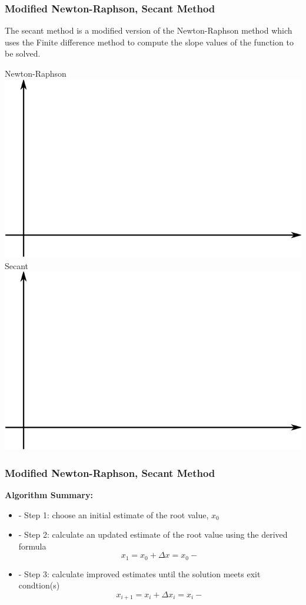 \documentclass[fleqn]{beamer} %
\newcommand{\sectionIIsubsectionVtitle}{Modified Newton-Raphson, Secant Method}
\begin{document}
			\begin{frame}
				\frametitle{\sectionIIsubsectionVtitle}
				\bigskip

				The {\PR secant} method is a modified version of the Newton-Raphson method which uses the Finite difference method to compute the slope values of the function to be solved. \\

				\begin{multicols}{2}
				Newton-Raphson
				\includegraphics[scale=.22]{images/lecture4_fig1.png} 
				Secant
				\includegraphics[scale=.22]{images/lecture4_fig1.png}
				\end{multicols}

			
				\btVFill 
			\end{frame}

			\begin{frame}
				\frametitle{\sectionIIsubsectionVtitle}
				\bigskip

				\textbf{Algorithm Summary:}
				\begin{itemize}
						\item - Step 1: choose an initial estimate of the root value, $x_0$  
					\item - Step 2: calculate an updated estimate of the root value using the derived formula \vspace{2mm} \\
						\[ x_{1}=x_0 + \Delta x = x_0 -  \]
					\item - Step 3: calculate improved estimates until the solution meets exit condtion(s)
						\[ x_{i+1}=x_i + \Delta x_i = x_i -  \]
				\end{itemize}
				\btVFill 
			\end{frame}
\end{document}
